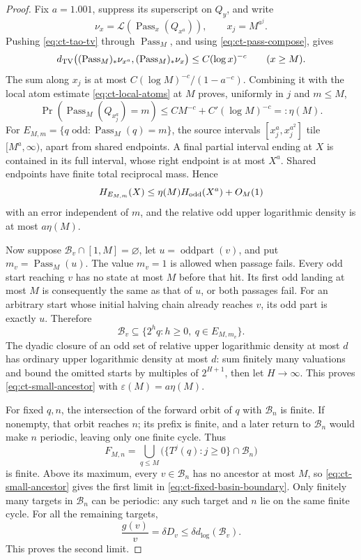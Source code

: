 \documentclass[11pt,a4paper]{article}
\begin{document}
\begin{proof}
Fix \(a=1.001\), suppress its superscript on \(Q_y\), and write
\[
 \nu_x=\mathcal L(\operatorname{Pass}_x(Q_{x^a})),\qquad
 x_j=M^{a^j}.
\]
Pushing \eqref{eq:ct-tao-tv} through \(\operatorname{Pass}_M\),
and using \eqref{eq:ct-pass-compose}, gives
\[
 d_{\rm TV}\bigl((\operatorname{Pass}_M)_*\nu_{x^{a}},
                 (\operatorname{Pass}_M)_*\nu_x\bigr)
             \le C(\log x)^{-c}\qquad(x\ge M).
\]
The sum along \(x_j\) is at most
\(C(\log M)^{-c}/(1-a^{-c})\). Combining it with the local
atom estimate \eqref{eq:ct-local-atoms} at \(M\) proves, uniformly
in \(j\) and \(m\le M\),
\[
 \Pr(\operatorname{Pass}_M(Q_{x_j^a})=m)
       \le C M^{-c}+C'(\log M)^{-c}=:\eta(M).
\]
For
\(E_{M,m}=\{q\text{ odd}:\operatorname{Pass}_M(q)=m\}\),
the source intervals \([x_j^a,x_j^{a^2}]\) tile
\([M^a,\infty)\), apart from shared endpoints.
A final partial interval ending at \(X\) is contained in its full
interval, whose right endpoint is at most \(X^a\).
Shared endpoints have finite total reciprocal mass. Hence
\[
 H_{E_{M,m}}(X)\le\eta(M)H_{\rm odd}(X^a)+O_M(1)
\]
with an error independent of \(m\), and the relative odd upper
logarithmic density is at most \(a\eta(M)\).

Now suppose \(\mathcal B_v\cap[1,M]=\varnothing\), let
\(u=\operatorname{oddpart}(v)\), and put
\(m_v=\operatorname{Pass}_M(u)\). The value \(m_v=1\) is allowed
when passage fails. Every odd start reaching \(v\) has no state
at most \(M\) before that hit. Its first odd landing at most \(M\)
is consequently the same as that of \(u\), or both passages fail.
For an arbitrary start whose initial halving chain already reaches
\(v\), its odd part is exactly \(u\). Therefore
\[
 \mathcal B_v\subseteq\{2^hq:h\ge0,\ q\in E_{M,m_v}\}.
\]
The dyadic closure of an odd set of relative upper logarithmic
density at most \(d\) has ordinary upper logarithmic density at most \(d\):
sum finitely many valuations and bound the omitted starts by
multiples of \(2^{H+1}\), then let \(H\to\infty\).
This proves \eqref{eq:ct-small-ancestor} with
\(\varepsilon(M)=a\eta(M)\).

For fixed \(q,n\), the intersection of the forward orbit of \(q\)
with \(\mathcal B_n\) is finite. If nonempty, that orbit reaches
\(n\); its prefix is finite, and a later return to \(\mathcal B_n\)
would make \(n\) periodic, leaving only one finite cycle.
Thus
\[
 F_{M,n}=\bigcup_{q\le M}
       \bigl(\{T^j(q):j\ge0\}\cap\mathcal B_n\bigr)
\]
is finite. Above its maximum, every \(v\in\mathcal B_n\) has
no ancestor at most \(M\), so
\eqref{eq:ct-small-ancestor} gives the first limit in
\eqref{eq:ct-fixed-basin-boundary}.
Only finitely many targets in \(\mathcal B_n\) can be periodic:
any such target and \(n\) lie on the same finite cycle.
For all the remaining targets,
\[
 \frac{g(v)}v=\delta D_v\le\delta d_{\log}(\mathcal B_v).
\]
This proves the second limit.
\end{proof}
\end{document}

